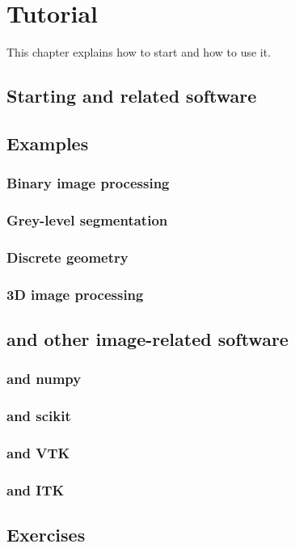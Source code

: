 \chapter{Tutorial}\label{chap:tutorial}
This chapter explains how to start \Pink and how to use it.

\section{Starting \Pink and related software}


\section{Examples}

\subsection{Binary image processing}

\subsection{Grey-level segmentation}

\subsection{Discrete geometry}

\subsection{3D image processing}

\section{\Pink and other image-related software}

\subsection{\Pink and numpy}

\subsection{\Pink and scikit}

\subsection{\Pink and VTK}

\subsection{\Pink and ITK}

\section{Exercises}

